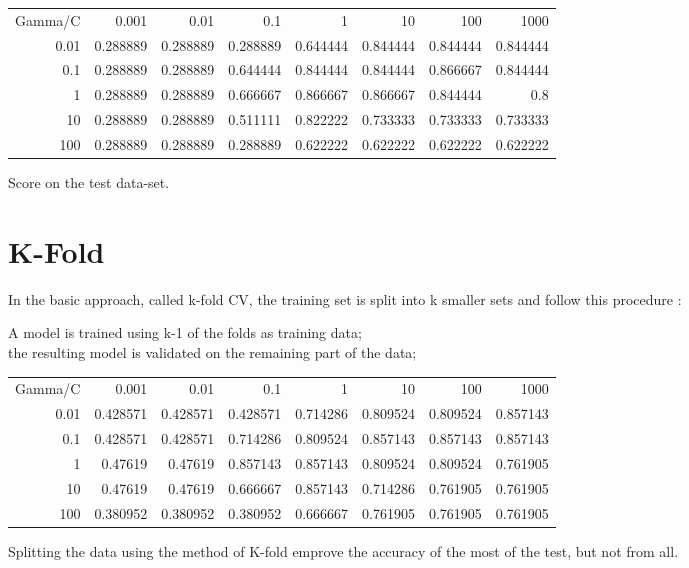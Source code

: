 \documentclass[11pt]{article}
\theoremstyle{plain}
\begin{document}
\begin{center}
\begin{tabular}{|| r |r |r |r |r |r |r |r ||}
\hline
   Gamma/C    & 0.001    & 0.01     & 0.1      & 1        & 10        & 100        & 1000        \\
   0.01 & 0.288889 & 0.288889 & 0.288889 & 0.644444 &  0.844444 &   0.844444 &    0.844444 \\
   0.1  & 0.288889 & 0.288889 & 0.644444 & 0.844444 &  0.844444 &   0.866667 &    0.844444 \\
   1    & 0.288889 & 0.288889 & 0.666667 & 0.866667 &  0.866667 &   0.844444 &    0.8      \\
  10    & 0.288889 & 0.288889 & 0.511111 & 0.822222 &  0.733333 &   0.733333 &    0.733333 \\
 100    & 0.288889 & 0.288889 & 0.288889 & 0.622222 &  0.622222 &   0.622222 &    0.622222 \\
\hline
\end{tabular}
\end{center}



Score on the test data-set.
\section{K-Fold}
In the basic approach, called k-fold CV, the training set is split into k smaller sets and follow this procedure : 


A model is trained using k-1 of the folds as training data;\\
the resulting model is validated on the remaining part of the data;
\\

\begin{center}
\begin{tabular}{|| r |r |r |r |r | r |r |r ||}
\hline
   Gamma/C    & 0.001    & 0.01     & 0.1      & 1        & 10        & 100        & 1000        \\
   0.01 & 0.428571 & 0.428571 & 0.428571 & 0.714286 &  0.809524 &   0.809524 &    0.857143 \\
   0.1  & 0.428571 & 0.428571 & 0.714286 & 0.809524 &  0.857143 &   0.857143 &    0.857143 \\
   1    & 0.47619  & 0.47619  & 0.857143 & 0.857143 &  0.809524 &   0.809524 &    0.761905 \\
  10    & 0.47619  & 0.47619  & 0.666667 & 0.857143 &  0.714286 &   0.761905 &    0.761905 \\
 100    & 0.380952 & 0.380952 & 0.380952 & 0.666667 &  0.761905 &   0.761905 &    0.761905 \\
\hline
\end{tabular}
\end{center}




Splitting the data using the method of K-fold emprove the accuracy of the most of the test, but not from all.
\end{document}
